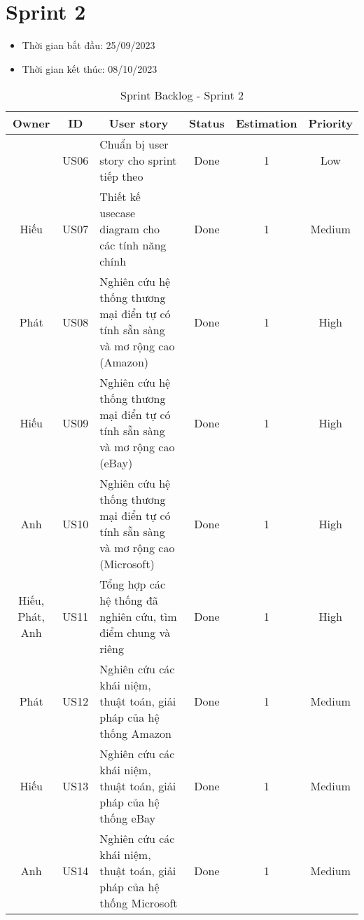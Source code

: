 \section{Sprint 2}
\begin{itemize}
    \item Thời gian bắt đầu: 25/09/2023
    \item Thời gian kết thúc: 08/10/2023
\end{itemize} 
\begin{table}[H]
    \begin{tabular}{|c|c|m{6cm}|c|c|c|}
    \hline
    \textbf{Owner} & \textbf{ID} & \multicolumn{1}{c|}{\textbf{User story}}                                & \textbf{Status} & \textbf{Estimation} & \textbf{Priority} \\ \hline
                & US06        & Chuẩn bị user story cho sprint tiếp theo                              & Done            & 1                   & Low           \\ \hline
    Hiếu           & US07        & Thiết kế usecase diagram cho các tính năng chính                         & Done            & 1                   & Medium            \\ \hline
    Phát           & US08        & Nghiên cứu hệ thống thương mại điển tự có tính sẵn sàng và mơ rộng cao (Amazon)                             & Done            & 1                   & High           \\ \hline
    Hiếu          & US09        & Nghiên cứu hệ thống thương mại điển tự có tính sẵn sàng và mơ rộng cao (eBay)                       & Done            & 1                   & High           \\ \hline
    Anh           & US10        & Nghiên cứu hệ thống thương mại điển tự có tính sẵn sàng và mơ rộng cao (Microsoft)                               & Done            & 1                   & High           \\ \hline
    Hiếu, Phát, Anh           & US11        & Tổng hợp các hệ thống đã nghiên cứu, tìm điểm chung và riêng                          & Done            & 1                   & High           \\ \hline
    Phát           & US12        & Nghiên cứu các khái niệm, thuật toán, giải pháp của hệ thống Amazon                        & Done            & 1                   & Medium           \\ \hline
    Hiếu          & US13        & Nghiên cứu các khái niệm, thuật toán, giải pháp của hệ thống eBay                        & Done            & 1                   & Medium           \\ \hline
    Anh           & US14        & Nghiên cứu các khái niệm, thuật toán, giải pháp của hệ thống Microsoft                        & Done            & 1                   & Medium           \\ \hline
    \end{tabular}
    \caption{Sprint Backlog - Sprint 2}
    \label{tab:sprint-2}
\end{table}

